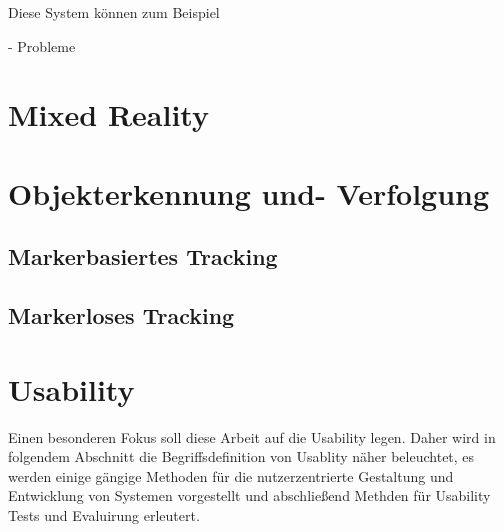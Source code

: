 Diese System können zum Beispiel    


-  Probleme

\section{Mixed Reality}



\section{Objekterkennung und- Verfolgung}



\subsection{Markerbasiertes Tracking}



\subsection{Markerloses Tracking}



\section{Usability}

Einen besonderen Fokus soll diese Arbeit auf die Usability legen. Daher wird in folgendem Abschnitt die Begriffsdefinition von Usablity näher beleuchtet, es werden einige 
gängige Methoden für die nutzerzentrierte Gestaltung und Entwicklung von Systemen vorgestellt und abschließend Methden für Usability Tests und Evaluirung erleutert. 

